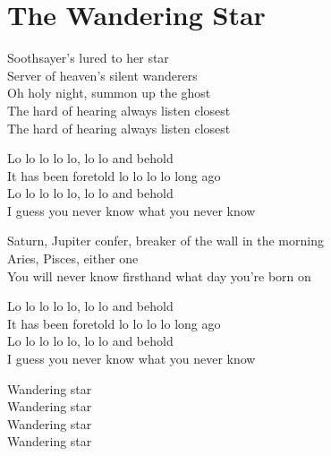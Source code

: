 \documentclass[12pt]{ctexart}
\begin{document}
	
	\section*{The Wandering Star}
	
	\hspace{1em}
	
	\begin{paracol}{2}
		
		\begin{leftcolumn*}
			Soothsayer's lured to her star \\
			Server of heaven's silent wanderers \\
			Oh holy night, summon up the ghost \\
			The hard of hearing always listen closest \\
			The hard of hearing always listen closest
			
			\hspace{2em}
			
			Lo lo lo lo lo, lo lo and behold \\
			It has been foretold lo lo lo lo long ago \\
			Lo lo lo lo lo, lo lo and behold \\
			I guess you never know what you never know
			
			\hspace{2em}
			
			Saturn, Jupiter confer, breaker of the wall in the morning \\
			Aries, Pisces, either one \\
			You will never know firsthand what day you're born on
			
			\hspace{2em}
			
			Lo lo lo lo lo, lo lo and behold \\
			It has been foretold lo lo lo lo long ago \\
			Lo lo lo lo lo, lo lo and behold \\
			I guess you never know what you never know
			
			\hspace{2em}
			
			Wandering star\\
			Wandering star\\
			Wandering star\\
			Wandering star
			
		\end{leftcolumn*}
		

\end{paracol}
\end{document}
